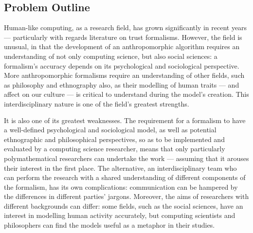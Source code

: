 \subsection{Problem Outline}\label{sec:problem_outline}




Human-like computing, as a research field, has grown significantly in recent years --- particularly with regards literature on trust formalisms. However, the field is unusual, in that the development of an anthropomorphic algorithm requires an understanding of not only computing science, but also social sciences: a formalism's accuracy depends on its psychological and sociological perspective. More anthropomorphic formalisms require an understanding of other fields, such as philosophy and ethnography also, as their modelling of human traits --- and affect on our culture --- is critical to understand during the model's creation. This interdisciplinary nature is one of the field's greatest strengths.\par

It is also one of its greatest weaknesses. The requirement for a formalism to have a well-defined psychological and sociological model, as well as potential ethnographic and philosophical perspectives, so as to be implemented and evaluated by a computing science researcher, means that only particularly polymathematical researchers can undertake the work --- assuming that it arouses their interest in the first place. The alternative, an interdisciplinary team who can perform the research with a shared understanding of different components of the formalism, has its own complications: communication can be hampered by the differences in different parties' jargons. Moreover, the aims of researchers with different backgrounds can differ: some fields, such as the social sciences, have an interest in modelling human activity accurately, but computing scientists and philosophers can find the models useful as a metaphor in their studies.\par

